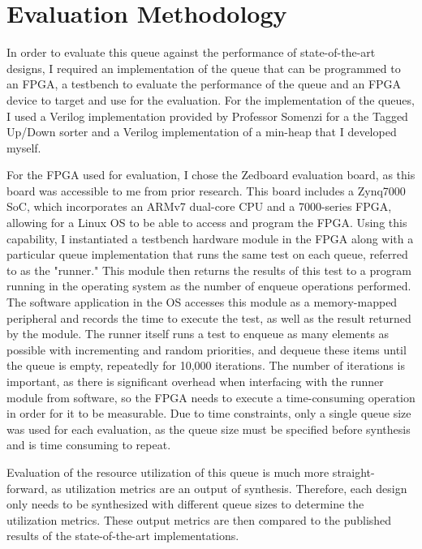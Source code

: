 \section{Evaluation Methodology}
\label{sec:method}

In order to evaluate this queue against the performance of state-of-the-art designs, I required an implementation of the queue that can be programmed to an FPGA, a testbench to evaluate the performance of the queue and an FPGA device to target and use for the evaluation. For the implementation of the queues, I used a Verilog implementation provided by Professor Somenzi for a the Tagged Up/Down sorter and a Verilog implementation of a min-heap that I developed myself. 

For the FPGA used for evaluation, I chose the Zedboard evaluation board, as this board was accessible to me from prior research. This board includes a Zynq7000 SoC, which incorporates an ARMv7 dual-core CPU and a 7000-series FPGA, allowing for a Linux OS to be able to access and program the FPGA. Using this capability, I instantiated a testbench hardware module in the FPGA along with a particular queue implementation that runs the same test on each queue, referred to as the "runner." This module then returns the results of this test to a program running in the operating system as the number of enqueue operations performed. The software application in the OS accesses this module as a memory-mapped peripheral and records the time to execute the test, as well as the result returned by the module. The runner itself runs a test to enqueue as many elements as possible with incrementing and random priorities, and dequeue these items until the queue is empty, repeatedly for 10,000 iterations. The number of iterations is important, as there is significant overhead when interfacing with the runner module from software, so the FPGA needs to execute a time-consuming operation in order for it to be measurable. Due to time constraints, only a single queue size was used for each evaluation, as the queue size must be specified before synthesis and is time consuming to repeat.

Evaluation of the resource utilization of this queue is much more straight-forward, as utilization metrics are an output of synthesis. Therefore, each design only needs to be synthesized with different queue sizes to determine the utilization metrics. These output metrics are then compared to the published results of the state-of-the-art implementations.